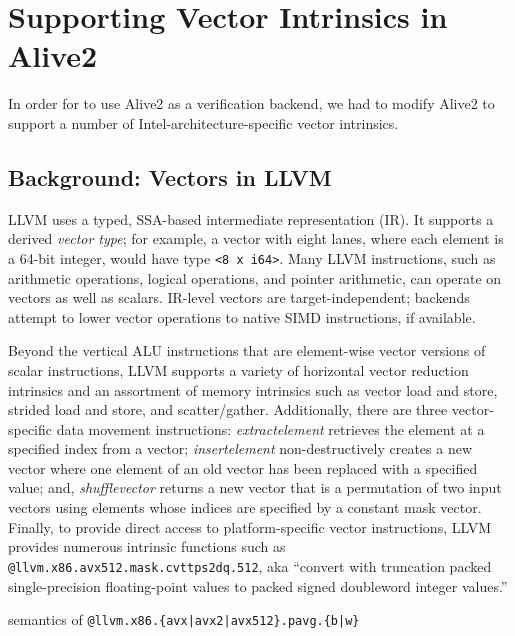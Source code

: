 \section{Supporting Vector Intrinsics in Alive2}

In order for \minotaur{} to use Alive2 as a verification backend, we had
to modify Alive2 to support a number of Intel-architecture-specific
vector intrinsics.

\subsection{Background: Vectors in LLVM}

LLVM uses a typed, SSA-based intermediate representation (IR).
%
It supports a derived \emph{vector type}; for example, a vector with
eight lanes, where each element is a 64-bit integer, would have type
\texttt{<8 x i64>}.
%
Many LLVM instructions, such as arithmetic operations, logical operations,
and pointer arithmetic, can operate on vectors as well as scalars.
%
IR-level vectors are target-independent; backends attempt to lower
vector operations to native SIMD instructions, if available.


Beyond the vertical ALU instructions that are element-wise vector
versions of scalar instructions, LLVM supports a variety of horizontal
vector reduction intrinsics and an assortment of memory intrinsics
such as vector load and store, strided load and store, and
scatter/gather.
%
Additionally, there are three vector-specific data movement
instructions:
%
\textit{extractelement} retrieves the element at a specified index from
a vector;
%
\textit{insertelement} non-destructively creates a new vector where
one element of an old vector has been replaced with a specified value;
%
and, \textit{shufflevector} returns a new vector that is a permutation
of two input vectors using elements whose indices are specified by a
constant mask vector.
%
Finally, to provide direct access to platform-specific vector
instructions, LLVM provides numerous intrinsic functions such as
\texttt{@llvm.x86.avx512.mask.cvttps2dq.512}, aka ``convert with
truncation packed single-precision floating-point values to packed
signed doubleword integer values.''


\renewcommand\algorithmicdo{}
\begin{algorithm}[tbp]
    \caption{semantics of \texttt{@llvm.x86.\{avx|avx2|avx512\}.pavg.\{b|w\}}}
    \label{semantic:pavg}
    \begin{algorithmic}[1]
    \Else
    \EndIf
    \EndFor
    \end{algorithmic}
\end{algorithm}


